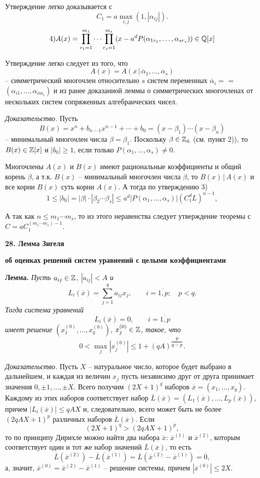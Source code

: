 \documentclass[12pt]{article}
\let\ol\overline
\begin{document}
Утверждение легко доказывается с
$$ C_1= a \max_{i,j} (1, |\alpha_{ij}|).$$
$$
4) A(x)= \prod_{r_1=1}^{m_1} \cdots \prod_{r_s=1}^{m_s}
(x-a^dP(\alpha_{1r_1}, \dots, \alpha_{sr_s})) \in \Bbb Q [x]
$$

Утверждение легко следует из того, что
$$ A(x) = A(x \,| \, \ol {\alpha}_1, \dots, \ol {\alpha}_s) $$
-- симметрический многочлен относительно $s$  систем переменных
$\ol{\alpha}_i=$     \linebreak =$ (\alpha_{i1}, \dots,
\alpha_{im_i})$ и из ранее доказанной леммы о симметрических
многочленах от нескольких систем сопряженных алгебраических чисел.

\emph{Доказательство.} Пусть
$$
B(x)= x^n+b_{n-1}x^{n-1}+ \cdots +b_0 = (x- \beta_1) \cdots (x-
\beta_n)
$$
-- минимальный многочлен числа $\beta = \beta_1$. Поскольку $\beta
\in \Bbb Z_{\Bbb A}$ (см. пункт 2)), то $B(x) \in \Bbb Z [x]$ и
$|b_0| \ge 1$, если только $P(\alpha_1, \dots, \alpha_s) \ne 0$.

Многочлены $A(x)$  и $B(x)$  имеют рациональные коэффициенты и
общий корень $\beta$,  а т.к. $B(x)$ -- минимальный многочлен
числа $\beta$,    то $B(x) \,| \, A(x)$  и все корни $B(x)$  суть
корни $A(x)$. А тогда по утверждению 3)
$$
1 \le |b_0| = |\beta| \cdot |\beta_2 \cdots \beta_s| \le
a^d|P(\alpha_1, \dots, \alpha_s)| ( C_1^d L)^{n-1},
$$

А так как $n \le m_1 \cdots m_s$, то из этого неравенства следует
утверждение теоремы с $C=a C_1^{(m_1 \cdots m_s)-1}$.



\vskip 5mm \centerline{\bf {28. Лемма Зигеля}  } \centerline{\bf
{об оценках решений систем уравнений с целыми коэффициентами}}
\vskip 5mm

{\bf Лемма.} {\it Пусть $a_{ij} \in \Bbb Z$, $|a_{ij}| < A$  и
$$
L_i(\ol x)= \sum_{j=1}^q a_{ij}x_j, \qquad  i= \ol {1,p}; \quad
p<q.
$$
Тогда система уравнений
$$
L_i(\ol x)=0, \qquad i= \ol {1,p}
$$
имеет решение $(x_1^{(0)}, \dots, x_q^{(0)})$, $x_j^{(0)} \in \Bbb
Z$, такое, что}
$$
0< \max_j |x_j^{(0)}| \le 1 + (qA)^{\dfrac p{q-p}}.
$$


\emph{Доказательство.} Пусть $X$  -- натуральное число, которое
будет выбрано в дальнейшем, и каждая из величин $x_j$ пусть
независимо друг от друга принимает значения $0, \pm 1, \dots, \pm
X.$ Всего получим $(2X+1)^q$ наборов $\ol x=(x_1, \dots, x_q)$.
Каждому из этих наборов соответствует набор $\ol L(\ol x) =
(L_1(\ol x ), \dots, L_p ( \ol x ))$, причем $|L_i(\ol x )| \le
qAX$  и, следовательно, всего может быть не более $(2qAX+1)^p$
различных наборов   $\ol L ( \ol x )$.   Если
\begin{equation}\label{2}
(2X+1)^q > (2qAX+1)^p,
 \end{equation}
  то по принципу
Дирихле можно найти два  набора  $\ol x$: $\ol x^{(1)}$ и $\ol
x^{(2)}$, которым соответствует один и тот же набор значений $\ol
L (\ol x)$, то есть
$$
\ol L (\ol x^{(2)}) - \ol L (\ol x^{(1)}) = \ol L (\ol x^{(2)}-
\ol x^{(1)}) = \ol 0,
$$
а, значит, $\ol x^{(0)} = \ol x^{(2)}- \ol x^{(1)}  $ -- решение
системы, причем $|\ol x^{(0)}| \le 2X$.
\end{document}

